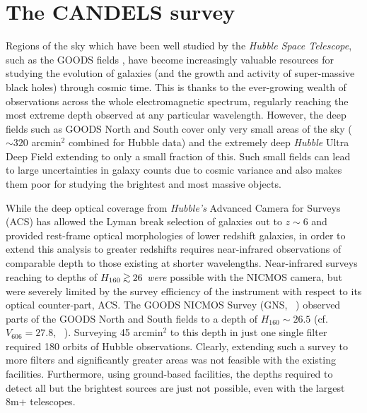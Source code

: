 \section{The CANDELS survey}\label{sec:intro-candels}
Regions of the sky which have been well studied by the \emph{Hubble Space Telescope}, such as the GOODS fields \citep{2004ApJ...600L..93G}, have become increasingly valuable resources for studying the evolution of galaxies (and the growth and activity of super-massive black holes) through cosmic time. This is thanks to the ever-growing wealth of observations across the whole electromagnetic spectrum, regularly reaching the most extreme depth observed at any particular wavelength. However, the deep fields such as GOODS North and South cover only very small areas of the sky ($\sim 320$ arcmin$^{2}$ combined for Hubble data) and the extremely deep \emph{Hubble} Ultra Deep Field extending to only a small fraction of this. Such small fields can lead to large uncertainties in galaxy counts due to cosmic variance and also makes them poor for studying the brightest and most massive objects.

While the deep optical coverage from \emph{Hubble's} Advanced Camera for Surveys (ACS) has allowed the Lyman break selection of galaxies out to $z\sim6$ and provided rest-frame optical morphologies of lower redshift galaxies, in order to extend this analysis to greater redshifts requires near-infrared observations of comparable depth to those existing at shorter wavelengths. Near-infrared surveys reaching to depths of $H_{160} \simgreat 26$ \emph{were} possible with the NICMOS camera, but were severely limited by the survey efficiency of the instrument with respect to its optical counter-part, ACS. The GOODS NICMOS Survey (GNS, \citeauthor{Conselice:2011ia}~\citeyear{Conselice:2011ia}) observed parts of the GOODS North and South fields to a depth of $H_{160} \sim 26.5$ (cf. $V_{606} = 27.8$, \citeauthor{2004ApJ...600L..93G}~\citeyear{2004ApJ...600L..93G}). Surveying 45 arcmin$^{2}$ to this depth in just one single filter required 180 orbits of Hubble observations. Clearly, extending such a survey to more filters and significantly greater areas was not feasible with the existing facilities. Furthermore, using ground-based facilities, the depths required to detect all but the brightest sources are just not possible, even with the largest 8m+ telescopes. 

